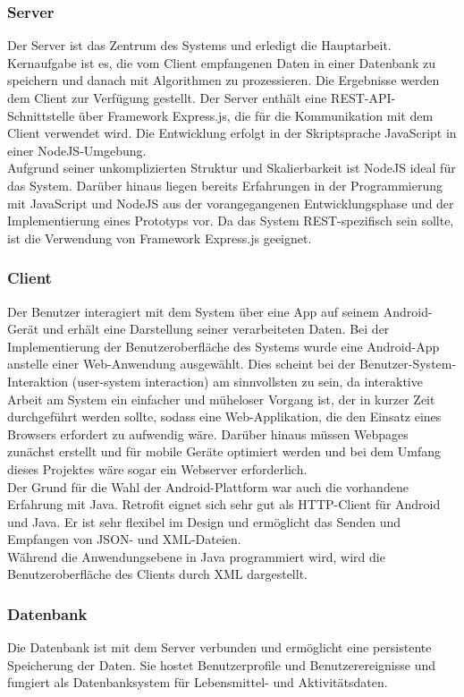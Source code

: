 \subsubsection{Server}
	Der Server ist das Zentrum des Systems und erledigt die Hauptarbeit. Kernaufgabe ist es, die vom Client empfangenen Daten in einer Datenbank zu speichern und danach mit Algorithmen zu prozessieren. Die Ergebnisse werden dem Client zur Verfügung gestellt. Der Server enthält eine REST-API-Schnittstelle über Framework Express.js, die für die Kommunikation mit dem Client verwendet wird. Die Entwicklung erfolgt in der Skriptsprache JavaScript in einer NodeJS-Umgebung.\\
	Aufgrund seiner unkomplizierten Struktur und Skalierbarkeit ist NodeJS ideal für das System. Darüber hinaus liegen bereits Erfahrungen in der Programmierung mit JavaScript und NodeJS aus der vorangegangenen Entwicklungsphase und der Implementierung eines Prototyps vor. Da das System REST-spezifisch sein sollte, ist die Verwendung von Framework Express.js geeignet.  
	\subsubsection{Client}
	Der Benutzer interagiert mit dem System über eine App auf seinem Android-Gerät und erhält eine Darstellung seiner verarbeiteten Daten. Bei der Implementierung der Benutzeroberfläche des Systems wurde eine Android-App anstelle einer Web-Anwendung ausgewählt. Dies scheint bei der Benutzer-System-Interaktion (user-system interaction) am sinnvollsten zu sein, da interaktive Arbeit am System ein einfacher und müheloser Vorgang ist, der in kurzer Zeit durchgeführt werden sollte, sodass eine Web-Applikation, die den Einsatz eines Browsers erfordert zu aufwendig wäre. Darüber hinaus müssen Webpages zunächst erstellt und für mobile Geräte optimiert werden und bei dem Umfang dieses Projektes wäre sogar ein Webserver erforderlich.\\
	Der Grund für die Wahl der Android-Plattform war auch die vorhandene Erfahrung mit Java. Retrofit eignet sich sehr gut als HTTP-Client für Android und Java. Er ist sehr flexibel im Design und ermöglicht das Senden und Empfangen von JSON- und XML-Dateien.\\
	Während die Anwendungsebene in Java programmiert wird, wird die Benutzeroberfläche des Clients durch XML dargestellt.
	\subsubsection{Datenbank}
	Die Datenbank ist mit dem Server verbunden und ermöglicht eine persistente Speicherung der Daten. Sie hostet Benutzerprofile und Benutzerereignisse und fungiert als Datenbanksystem für Lebensmittel- und Aktivitätsdaten.

